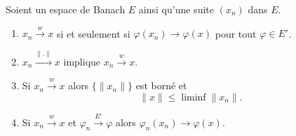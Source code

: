 \begin{proposition}     \label{PROPooFJBBooKkRwIp}
    Soient un espace de Banach \( E\) ainsi qu'une suite \( (x_n)\) dans \( E\).
    \begin{enumerate}
        \item       \label{ITEMooDMMTooSBINKN}
            \( x_n\stackrel{w}{\longrightarrow}x\) si et seulement si \( \varphi(x_n)\to\varphi(x)\) pour tout \( \varphi\in E'\).
        \item       \label{ITEMooFZKXooNqFGUb}
            \( x_n\stackrel{\| . \|}{\longrightarrow}x\) implique \( x_n\stackrel{w}{\longrightarrow}x\).
        \item       \label{ITEMooXPTSooYPwNgU}
            Si \( x_n\stackrel{w}{\longrightarrow}x\) alors \( \{ \| x_n \| \}\) est borné et
            \begin{equation}
                \| x \|\leq \liminf\| x_n \|.
            \end{equation}
        \item       \label{ITEMooAFRFooOXdsBy}
            Si \( x_n\stackrel{w}{\longrightarrow}x\) et \( \varphi_n\stackrel{E'}{\longrightarrow}\varphi\) alors \( \varphi_n(x_n)\to\varphi(x)\).
    \end{enumerate}
\end{proposition}

